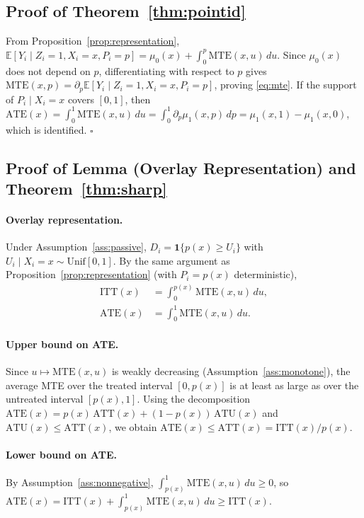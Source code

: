 \documentclass[12pt]{article}
\newcommand{\E}{\mathbb{E}}
\newcommand{\ATT}{\mathrm{ATT}}
\newcommand{\ATE}{\mathrm{ATE}}
\newcommand{\ITT}{\mathrm{ITT}}
\newcommand{\ATU}{\mathrm{ATU}}
\newcommand{\MTE}{\mathrm{MTE}}
\begin{document}
\subsection*{Proof of Theorem~\ref{thm:pointid}}

From Proposition~\ref{prop:representation},
$\E[Y_i \mid Z_i=1, X_i=x, P_i=p] = \mu_0(x) + \int_0^p \MTE(x,u)\,du$.
Since $\mu_0(x)$ does not depend on $p$, differentiating with respect to
$p$ gives $\MTE(x,p) = \partial_p \E[Y_i \mid Z_i=1, X_i=x, P_i=p]$,
proving \eqref{eq:mte}. If the support of $P_i \mid X_i=x$ covers $[0,1]$,
then $\ATE(x) = \int_0^1 \MTE(x,u)\,du = \int_0^1 \partial_p \mu_1(x,p)\,dp
= \mu_1(x,1) - \mu_1(x,0)$, which is identified. \hfill$\square$

\subsection*{Proof of Lemma (Overlay Representation) and Theorem~\ref{thm:sharp}}

\paragraph{Overlay representation.}
Under Assumption~\ref{ass:passive}, $D_i = \mathbf{1}\{p(x) \geq U_i\}$
with $U_i \mid X_i=x \sim \mathrm{Unif}[0,1]$. By the same argument as
Proposition~\ref{prop:representation} (with $P_i = p(x)$ deterministic),
\begin{align}
  \ITT(x) &= \int_0^{p(x)} \MTE(x,u)\,du,
  \label{eq:itt_rep} \\
  \ATE(x) &= \int_0^1 \MTE(x,u)\,du.
  \label{eq:ate_rep}
\end{align}

\paragraph{Upper bound on ATE.}
Since $u \mapsto \MTE(x,u)$ is weakly decreasing
(Assumption~\ref{ass:monotone}), the average MTE over the treated interval
$[0, p(x)]$ is at least as large as over the untreated interval
$[p(x), 1]$. Using the decomposition
$\ATE(x) = p(x)\,\ATT(x) + (1-p(x))\,\ATU(x)$ and $\ATU(x) \leq \ATT(x)$,
we obtain $\ATE(x) \leq \ATT(x) = \ITT(x)/p(x)$.

\paragraph{Lower bound on ATE.}
By Assumption~\ref{ass:nonnegative},
$\int_{p(x)}^1 \MTE(x,u)\,du \geq 0$, so
$\ATE(x) = \ITT(x) + \int_{p(x)}^1 \MTE(x,u)\,du \geq \ITT(x)$.
\end{document}

